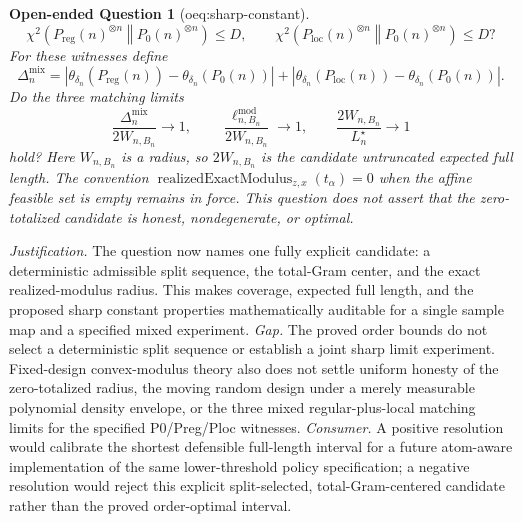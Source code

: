\documentclass{article}
\newtheorem{openendedquestion}{Open-ended Question}
\begin{document}
\begin{openendedquestion}[oeq:sharp-constant]
\[
 \chi^2\!\left(P_{\mathrm{reg}}(n)^{\otimes n}\middle\Vert P_0(n)^{\otimes n}\right)\leq D,
 \qquad
 \chi^2\!\left(P_{\mathrm{loc}}(n)^{\otimes n}\middle\Vert P_0(n)^{\otimes n}\right)\leq D?
\]
For these witnesses define
\[
 \Delta_n^{\mathrm{mix}}
 =\left|\theta_{\delta_n}\!\left(P_{\mathrm{reg}}(n)\right)-
          \theta_{\delta_n}\!\left(P_0(n)\right)\right|
  +\left|\theta_{\delta_n}\!\left(P_{\mathrm{loc}}(n)\right)-
          \theta_{\delta_n}\!\left(P_0(n)\right)\right|.
\]
Do the three matching limits
\[
 \frac{\Delta_n^{\mathrm{mix}}}{2W_{n,B_n}}\longrightarrow1,
 \qquad
 \frac{\ell^{\mathrm{mod}}_{n,B_n}}{2W_{n,B_n}}\longrightarrow1,
 \qquad
 \frac{2W_{n,B_n}}{L_n^\star}\longrightarrow1
\]
hold?  Here \(W_{n,B_n}\) is a radius, so \(2W_{n,B_n}\) is the candidate untruncated expected full length.  The convention \(\operatorname{realizedExactModulus}_{z,x}(t_\alpha)=0\) when the affine feasible set is empty remains in force.  This question does not assert that the zero-totalized candidate is honest, nondegenerate, or optimal.
\end{openendedquestion}
\par\smallskip\noindent \textit{Justification.} The question now names one fully explicit candidate: a deterministic admissible split sequence, the total-Gram center, and the exact realized-modulus radius. This makes coverage, expected full length, and the proposed sharp constant properties mathematically auditable for a single sample map and a specified mixed experiment. \textit{Gap.} The proved order bounds do not select a deterministic split sequence or establish a joint sharp limit experiment. Fixed-design convex-modulus theory also does not settle uniform honesty of the zero-totalized radius, the moving random design under a merely measurable polynomial density envelope, or the three mixed regular-plus-local matching limits for the specified P0/Preg/Ploc witnesses. \textit{Consumer.} A positive resolution would calibrate the shortest defensible full-length interval for a future atom-aware implementation of the same lower-threshold policy specification; a negative resolution would reject this explicit split-selected, total-Gram-centered candidate rather than the proved order-optimal interval.
\end{document}
